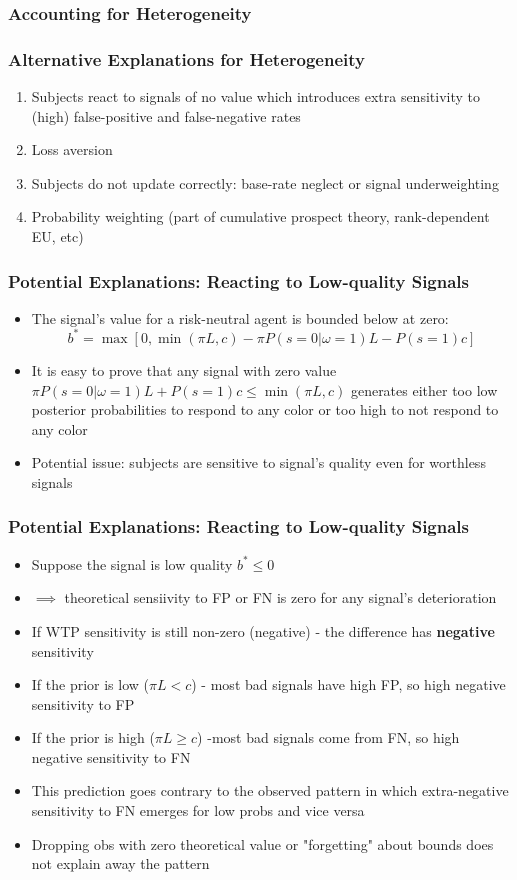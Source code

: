 \documentclass[11pt,hyperref={bookmarks=false}]{beamer}
\begin{document}
\begin{frame}
\frametitle{Accounting for Heterogeneity}
\footnotesize

\end{frame}



\begin{frame}
\frametitle{Alternative Explanations for Heterogeneity}
\begin{enumerate}
\item Subjects react to signals of no value which introduces extra sensitivity to (high) false-positive and false-negative rates
\item Loss aversion 
\item Subjects do not update correctly: base-rate neglect or signal underweighting
\item Probability weighting (part of cumulative prospect theory, rank-dependent EU, etc)
\end{enumerate}
\end{frame}


\begin{frame}
\frametitle{Potential Explanations: Reacting to Low-quality Signals}
\begin{itemize}
\item The signal's value for a risk-neutral agent is bounded below at zero: 
$$b^*=\max[0,\min(\pi L, c)-\pi P(s=0|\omega=1)L-P(s=1)c]$$
\item It is easy to prove that any signal with zero value $\pi P(s=0|\omega=1)L+P(s=1)c\leq \min(\pi L, c)$ generates either too low posterior probabilities to respond to any color or too high to not respond to any color
\item Potential issue: subjects are sensitive to signal's quality even for worthless signals
\end{itemize}
\end{frame}


\begin{frame}
\frametitle{Potential Explanations: Reacting to Low-quality Signals}
\begin{itemize}
\item Suppose the signal is low quality $b^*\leq 0$
\item $\implies$ theoretical sensiivity to FP or FN is zero for any signal's deterioration
\item If WTP sensitivity is still non-zero (negative) - the difference has \textbf{negative} sensitivity
\item If the prior is low ($\pi L<c$) - most bad signals have high FP, so high negative sensitivity to FP
\item If the prior is high ($\pi L\geq c$) -most bad signals come from FN, so high negative sensitivity to FN
\item This prediction goes contrary to the observed pattern in which extra-negative sensitivity to FN emerges for low probs and vice versa 
\item Dropping obs with zero theoretical value or "forgetting" about bounds does not explain away the pattern
\end{itemize}
\end{frame}
\end{document}

